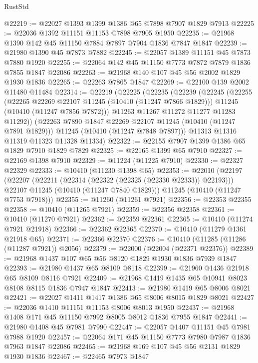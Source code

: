 \begin{lexlean}{RustStd}
\begin{coremodule}
@22219 := @22027 @1393 @1399 @1386 @65 @7898 @7907 @1829 @7913
@22225 := @22036 @1392 @11151 @11153 @7898 @7905 @1950
@22235 := @21968 @1390 @142 @45 @11150 @7884 @7897 @7904 @1836 @7847 @1847
@22239 := @21980 @1390 @45 @7873 @7882
@22245 := @22057 @1389 @11151 @45 @7873 @7880 @1920
@22255 := @22064 @142 @45 @11150 @7773 @7872 @7879 @1836 @7855 @1847 @22086
@22263 := @21968 @140 @107 @45 @56 @2002 @1829 @1930 @1836
@22265 := @22263 @7865 @1847
@22269 := @22100 @139 @2002 @11480 @11484
@22314 := @22219
    (@22225
      (@22235
        (@22239
          (@22245
            (@22255
              (@22265 @22269 @22107 @11245 (@10410 (@11247 @7866 @1829)))
              @11245
              (@10410 (@11247 @7856 @7872)))
            @11263
            @11267
            @11272
            @11277
            @11283
            @11292))
        (@22263 @7890 @1847 @22269 @22107 @11245 (@10410 (@11247 @7891 @1829)))
        @11245
        (@10410 (@11247 @7848 @7897)))
      @11313
      @11316
      @11319
      @11323
      @11328
      @11334)
@22322 := @22155 @7907 @1399 @1386 @65 @1829 @7910 @1829 @7829
@22325 := @22165 @1399 @65 @7910
@22327 := @22169 @1398 @7910
@22329 := @11224 (@11225 @7910)
@22330 := @22327 @22329
@22333 := @10410 (@11230 @1398 @65)
@22353 := @22010
    (@22197
      (@22207
        (@22211 (@22314 (@22322 (@22325 (@22330 @22333)) @22193)))
        @22107
        @11245
        (@10410 (@11247 @7840 @1829)))
      @11245
      (@10410 (@11247 @7753 @7918)))
@22355 := @11260 (@11261 @7921)
@22356 := @22353 @22355
@22358 := @10410 (@11265 @7921)
@22359 := @22356 @22358
@22361 := @10410 (@11270 @7921)
@22362 := @22359 @22361
@22365 := @10410 (@11274 @7921 @21918)
@22366 := @22362 @22365
@22370 := @10410 (@11279 @1361 @21918 @65)
@22371 := @22366 @22370
@22376 := @10410 (@11285 (@11286 (@11287 @7921)) @2056)
@22379 := @22000 (@22004 (@22371 @22376))
@22389 := @21968 @1437 @107 @65 @56 @8120 @1829 @1930 @1836 @7939 @1847
@22393 := @21980 @1437 @65 @8109 @8118
@22399 := @21960 @1436 @21918 @65 @8109 @8116 @7921
@22409 := @21968 @1419 @1435 @65 @10941 @8023 @8108 @8115 @1836 @7947 @1847
@22413 := @21980 @1419 @65 @8006 @8021
@22421 := @22027 @1411 @1417 @1386 @65 @8006 @8015 @1829 @8021
@22427 := @22036 @1410 @11151 @11153 @8006 @8013 @1950
@22437 := @21968 @1408 @171 @45 @11150 @7992 @8005 @8012 @1836 @7955 @1847
@22441 := @21980 @1408 @45 @7981 @7990
@22447 := @22057 @1407 @11151 @45 @7981 @7988 @1920
@22457 := @22064 @171 @45 @11150 @7773 @7980 @7987 @1836 @7963 @1847 @22086
@22465 := @21968 @169 @107 @45 @56 @2131 @1829 @1930 @1836
@22467 := @22465 @7973 @1847

\end{coremodule}
\end{lexlean}
